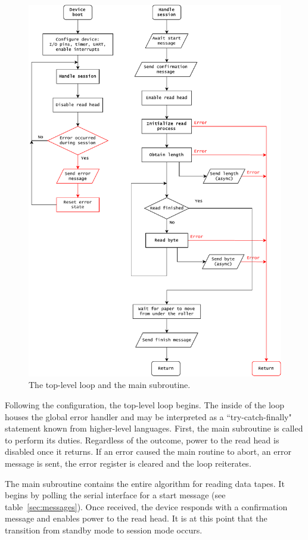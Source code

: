 \documentclass{article}
\begin{document}
	\begin{figure}[h]
		\includegraphics[width=\linewidth]{img/main}
		\caption{The top-level loop and the main subroutine.}
	\end{figure}
	\clearpage
	
	Following the configuration, the top-level loop begins. The inside of the
	loop houses the global error handler and may be interpreted as a
	``try-catch-finally" statement known from higher-level languages. First,
	the main subroutine is called to perform its duties. Regardless of the
	outcome, power to the read head is disabled once it returns. If an error
	caused the main routine to abort, an error message is sent, the error
	register is cleared and the loop reiterates.
	
	The main subroutine contains the entire algorithm for reading data tapes.
	It begins by polling the serial interface for a start message (see
	table~\ref{sec:messages}). Once received, the device responds with a
	confirmation message and enables power to the read head. It is at this
	point that the transition from standby mode to session mode occurs.
	
\end{document}
